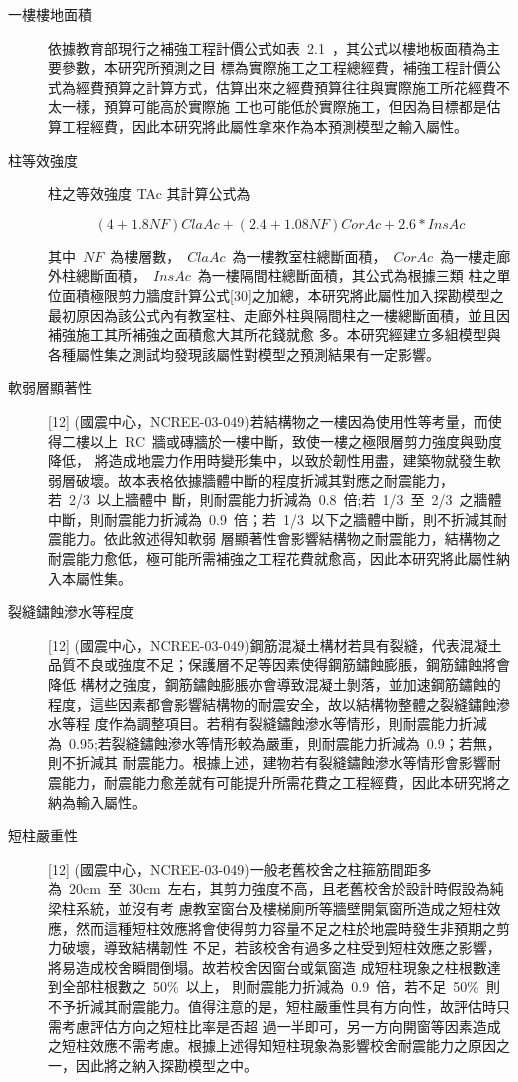 \begin{description}
  \item[一樓樓地面積]
  依據教育部現行之補強工程計價公式如表~2.1~，其公式以樓地板面積為主要參數，本研究所預測之目 標為實際施工之工程總經費，補強工程計價公式為經費預算之計算方式，估算出來之經費預算往往與實際施工所花經費不太一樣，預算可能高於實際施 工也可能低於實際施工，但因為目標都是估算工程經費，因此本研究將此屬性拿來作為本預測模型之輸入屬性。
  \item[柱等效強度]
  柱之等效強度 TAc 其計算公式為

  \begin{equation}(4+1.8NF)ClaAc+(2.4+1.08NF)CorAc+2.6*InsAc\end{equation} 

  其中~$NF$~為樓層數，~$ClaAc$~為一樓教室柱總斷面積，~$CorAc$~為一樓走廊外柱總斷面積，~$InsAc$~為一樓隔間柱總斷面積，其公式為根據三類 柱之單位面積極限剪力牆度計算公式[30]之加總，本研究將此屬性加入探勘模型之最初原因為該公式內有教室柱、走廊外柱與隔間柱之一樓總斷面積，並且因補強施工其所補強之面積愈大其所花錢就愈 多。本研究經建立多組模型與各種屬性集之測試均發現該屬性對模型之預測結果有一定影響。
  \item[軟弱層顯著性]
  [12] (國震中心，NCREE-03-049)若結構物之一樓因為使用性等考量，而使得二樓以上~RC~牆或磚牆於一樓中斷，致使一樓之極限層剪力強度與勁度降低， 將造成地震力作用時變形集中，以致於韌性用盡，建築物就發生軟弱層破壞。故本表格依據牆體中斷的程度折減其對應之耐震能力，若~2/3~以上牆體中 斷，則耐震能力折減為~0.8~倍;若~1/3~至~2/3~之牆體中斷，則耐震能力折減為~0.9~倍；若~1/3~以下之牆體中斷，則不折減其耐震能力。依此敘述得知軟弱 層顯著性會影響結構物之耐震能力，結構物之耐震能力愈低，極可能所需補強之工程花費就愈高，因此本研究將此屬性納入本屬性集。
  \item[裂縫鏽蝕滲水等程度]
  [12] (國震中心，NCREE-03-049)鋼筋混凝土構材若具有裂縫，代表混凝土品質不良或強度不足；保護層不足等因素使得鋼筋鏽蝕膨脹，鋼筋鏽蝕將會降低 構材之強度，鋼筋鏽蝕膨脹亦會導致混凝土剝落，並加速鋼筋鏽蝕的程度，這些因素都會影響結構物的耐震安全，故以結構物整體之裂縫鏽蝕滲水等程 度作為調整項目。若稍有裂縫鏽蝕滲水等情形，則耐震能力折減為~0.95;若裂縫鏽蝕滲水等情形較為嚴重，則耐震能力折減為~0.9；若無，則不折減其 耐震能力。根據上述，建物若有裂縫鏽蝕滲水等情形會影響耐震能力，耐震能力愈差就有可能提升所需花費之工程經費，因此本研究將之納為輸入屬性。
  \item[短柱嚴重性]
  [12] (國震中心，NCREE-03-049)一般老舊校舍之柱箍筋間距多為~20cm~至~30cm~左右，其剪力強度不高，且老舊校舍於設計時假設為純梁柱系統，並沒有考 慮教室窗台及樓梯廁所等牆壁開氣窗所造成之短柱效應，然而這種短柱效應將會使得剪力容量不足之柱於地震時發生非預期之剪力破壞，導致結構韌性 不足，若該校舍有過多之柱受到短柱效應之影響， 將易造成校舍瞬間倒塌。故若校舍因窗台或氣窗造 成短柱現象之柱根數達到全部柱根數之~50\%~以上， 則耐震能力折減為~0.9~倍，若不足~50\%~則不予折減其耐震能力。值得注意的是，短柱嚴重性具有方向性，故評估時只需考慮評估方向之短柱比率是否超 過一半即可，另一方向開窗等因素造成之短柱效應不需考慮。根據上述得知短柱現象為影響校舍耐震能力之原因之一，因此將之納入探勘模型之中。

\end{description}
